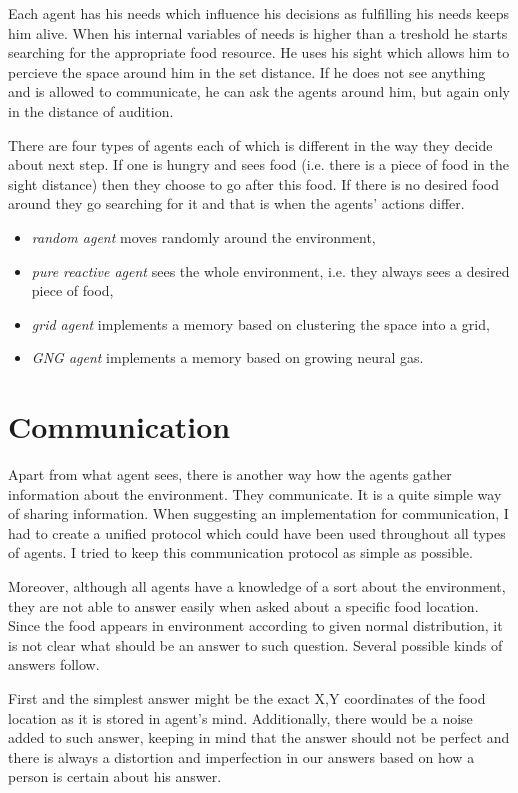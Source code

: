 Each agent has his needs which influence his decisions as fulfilling his needs keeps him alive. When his internal variables of needs is higher than a treshold he starts searching for the appropriate food resource. He uses his sight which allows him to percieve the space around him in the set distance. If he does not see anything and is allowed to communicate, he can ask the agents around him, but again only in the distance of audition.

There are four types of agents each of which is different in the way they decide about next step. If one is hungry and sees food (i.e. there is a piece of food in the sight distance) then they choose to go after this food. If there is no desired food around they go searching for it and that is when the agents' actions differ.

\begin{itemize}
\item \emph{random agent} moves randomly around the environment,
\item \emph{pure reactive agent} sees the whole environment, i.e. they always sees a desired piece of food, 
\item \emph{grid agent} implements a memory based on clustering the space into a grid,
\item \emph{GNG agent} implements a memory based on growing neural gas.
\end{itemize}

\section{Communication}

Apart from what agent sees, there is another way how the agents gather information about the environment. They communicate. It is a quite simple way of sharing information. When suggesting an implementation for communication, I had to create a unified protocol which could have been used throughout all types of agents. I tried to keep this communication protocol as simple as possible.

Moreover, although all agents have a knowledge of a sort about the environment, they are not able to answer easily when asked about a specific food location. Since the food appears in environment according to given normal distribution, it is not clear what should be an answer to such question. Several possible kinds of answers follow. 

First and the simplest answer might be the exact X,Y coordinates of the food location as it is stored in agent's mind. Additionally, there would be a noise added to such answer, keeping in mind that the answer should not be perfect and there is always a distortion and imperfection in our answers based on how a person is certain about his answer.
                                              
